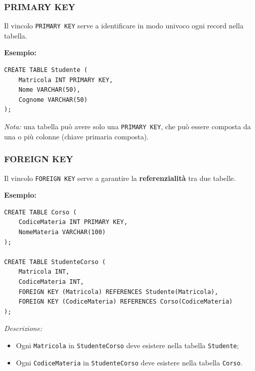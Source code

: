 \documentclass[a4paper,12pt]{article}
\newcommand{\code}[1]{\texttt{#1}}
\begin{document}
\subsubsection{PRIMARY KEY}

Il vincolo \code{PRIMARY KEY} serve a identificare in modo univoco ogni record nella tabella. 

\textbf{Esempio:}

\begin{verbatim}
CREATE TABLE Studente (
    Matricola INT PRIMARY KEY,
    Nome VARCHAR(50),
    Cognome VARCHAR(50)
);
\end{verbatim}

\textit{Nota:} una tabella può avere solo una \code{PRIMARY KEY}, che può essere composta da una o più colonne (chiave primaria composta).

\subsubsection{FOREIGN KEY}

Il vincolo \code{FOREIGN KEY} serve a garantire la \textbf{referenzialità} tra due tabelle. 

\textbf{Esempio:}

\begin{verbatim}
CREATE TABLE Corso (
    CodiceMateria INT PRIMARY KEY,
    NomeMateria VARCHAR(100)
);

CREATE TABLE StudenteCorso (
    Matricola INT,
    CodiceMateria INT,
    FOREIGN KEY (Matricola) REFERENCES Studente(Matricola),
    FOREIGN KEY (CodiceMateria) REFERENCES Corso(CodiceMateria)
);
\end{verbatim}

\textit{Descrizione:}  
\begin{itemize}
    \item Ogni \code{Matricola} in \code{StudenteCorso} deve esistere nella tabella \code{Studente};
    \item Ogni \code{CodiceMateria} in \code{StudenteCorso} deve esistere nella tabella \code{Corso}.
\end{itemize}

\end{document}
